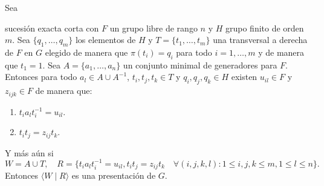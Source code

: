 \documentclass[tesis.tex]{subfiles}
\begin{document}
	\begin{prop}
		\label{prop:presentacion_vl}
		Sea  
		\begin{center}
		\end{center}
		sucesión exacta corta con $F$ un grupo libre de rango $n$ y $H$ grupo finito de orden $m$.
		Sea $\{ q_{1}, \dots, q_{m} \}$ los elementos de $H$ y $T = \{ t_{1},\dots, t_{m} \}$ una transversal a derecha de $F$ en $G$ elegido de manera que $\pi(t_{i}) = q_{i}$ para todo $i=1, \dots,m$ y de manera que $t_{1} = 1$.
		Sea $A = \{ a_{1}, \dots, a_{n} \}$ un conjunto minimal de generadores para $F$.
		Entonces para todo $a_l \in A \cup A^{-1}$, $t_i,t_j,t_k \in T$ y $q_{i},q_{j},q_{k} \in H$ existen $u_{il} \in F$ y $z_{ijk} \in F$ de manera que:
		\begin{enumerate}
			\item  $t_ia_{l}t_i^{-1} = u_{il}$.
			\item  $t_it_j = z_{ij}t_k$.
		\end{enumerate}
		Y más aún si
			\[
				W = A \cup T, \quad R = \{t_ia_{l}t_i^{-1} = u_{il},  t_it_j = z_{ij}t_k \quad \forall (i,j,k,l) :   1 \le i,j,k \le m, 1 \le l  \le n \}.
			\]
		Entonces  $\langle W \mid R \rangle$ es una presentación de $G$.
	\end{prop}
	
\end{document}
